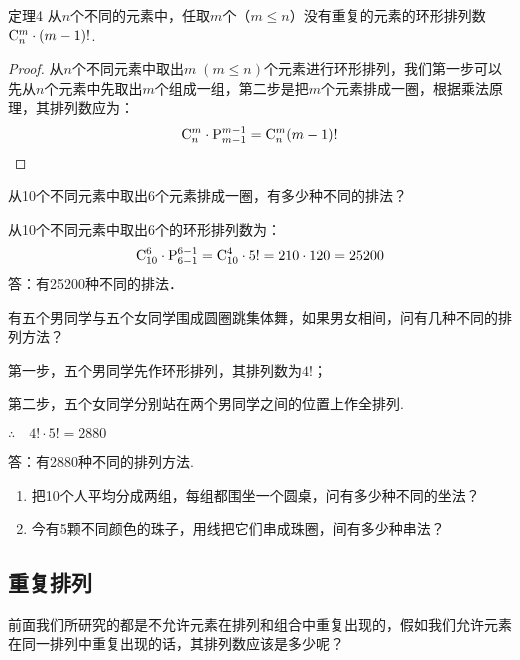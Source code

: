 \begin{blk}
  {定理4} 从$n$个不同的元素中，任取$m$个（$m\le n$）没有重复的元素的环形排列数${\rm C}^{m}_{n}\cdot (m-1)!$.  
\end{blk}

\begin{proof}
    从$n$个不同元素中取出$m\; (m\le n)$个元素进行环形排列，我们第一步可以先从$n$个元素中先取出$m$个组成一组，第二步是把$m$个元素排成一圈，根据乘法原理，其排列数应为：
\[{\rm C}^{m}_{n}\cdot {\rm P}^{m-1}_{m-1}={\rm C}^{m}_{n}(m-1)!\]
\end{proof}

\begin{example}
    从10个不同元素中取出6个元素排成一圈，有多少种不同的排法？
\end{example}

\begin{solution}
    从10个不同元素中取出6个的环形排列数为：
\[{\rm C}^{6}_{10}\cdot{\rm P}^{6-1}_{6-1}={\rm C}^{4}_{10}\cdot  5!=210\cdot 120=25200\]
答：有25200种不同的排法．
\end{solution}

\begin{example}
    有五个男同学与五个女同学围成圆圈跳集体舞，如果男女相间，问有几种不同的排列方法？
\end{example}

\begin{solution}
第一步，五个男同学先作环形排列，其排列数为$4!$；

第二步，五个女同学分别站在两个男同学之间的位置上作全排列.

$\therefore\quad 4! \cdot 5! =2880$

答：有2880种不同的排列方法.    
\end{solution}

\begin{ex}
\begin{enumerate}
\item 把10个人平均分成两组，每组都围坐一个圆桌，问有多少种不同的坐法？
\item 今有5颗不同颜色的珠子，用线把它们串成珠圈，间有多少种串法？
\end{enumerate}
\end{ex}

\subsection{重复排列}

前面我们所研究的都是不允许元素在排列和组合中重复出现的，假如我们允许元素在同一排列中重复出现的话，其排列数应该是多少呢？

